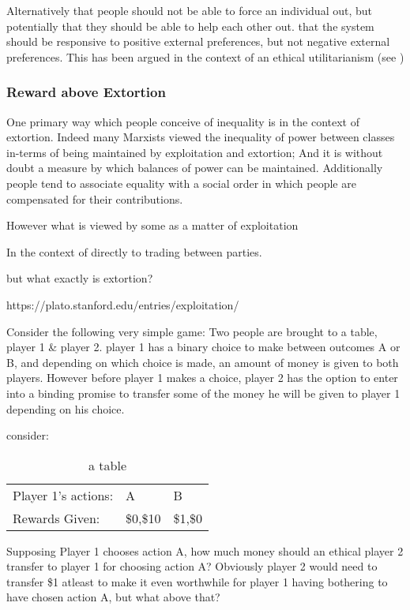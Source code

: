 Alternatively that people should not be able to force an individual out, but potentially that they should be able to help each other out.
that the system should be responsive to positive external preferences, but not negative external preferences.
This has been argued in the context of an ethical utilitarianism (see \cite{kymlicka2002contemporary})

\subsubsection{Reward above Extortion}

One primary way which people conceive of inequality is in the context of extortion. Indeed many Marxists viewed the inequality of power between classes in-terms of being maintained by exploitation and extortion; And it is without doubt a measure by which balances of power can be maintained. Additionally people tend to associate equality with a social order in which people are compensated for their contributions.

However what is viewed by some as a matter of exploitation

In the context of directly to trading between parties.

but what exactly is extortion? 

https://plato.stanford.edu/entries/exploitation/


Consider the following very simple game: Two people are brought to a table, player 1 \& player 2. player 1 has a binary choice to make between outcomes A or B, and depending on which choice is made, an amount of money is given to both players.
However before player 1 makes a choice, player 2 has the option to enter into a binding promise to transfer some of the money he will be given to player 1 depending on his choice.

consider:

\begin{table}[h!]
\begin{tabular}{lll}
Player 1's actions: & A   & B   \\
Rewards Given:      & \$0,\$10 & \$1,\$0
\end{tabular}
\caption{a table}
\end{table}

Supposing Player 1 chooses action A, how much money should an ethical player 2 transfer to player 1 for choosing action A?
Obviously player 2 would need to transfer \$1 atleast to make it even worthwhile for player 1 having bothering to have chosen action A, but what above that?

